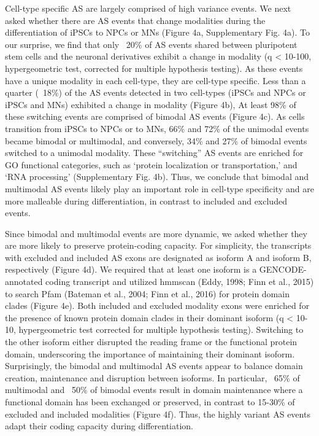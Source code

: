 Cell-type specific AS are largely comprised of high variance events.
We next asked whether there are AS events that change modalities during the differentiation of iPSCs to NPCs or MNs (Figure 4a, Supplementary Fig. 4a). To our surprise, we find that only ~20\% of AS events shared between pluripotent stem cells and the neuronal derivatives exhibit a change in modality (q < 10-100, hypergeometric test, corrected for multiple hypothesis testing). As these events have a unique modality in each cell-type, they are cell-type specific. Less than a quarter (~18\%) of the AS events detected in two cell-types (iPSCs and NPCs or iPSCs and MNs) exhibited a change in modality (Figure 4b), At least 98\% of these switching events are comprised of bimodal AS events (Figure 4c). As cells transition from iPSCs to NPCs or to MNs, 66\% and 72\% of the unimodal events became bimodal or multimodal, and conversely, 34\% and 27\% of bimodal events switched to a unimodal modality. These “switching” AS events are enriched for GO functional categories, such as ‘protein localization or transportation,’ and ‘RNA processing’ (Supplementary Fig. 4b). Thus, we conclude that bimodal and multimodal AS events likely play an important role in cell-type specificity and are more malleable during differentiation, in contrast to included and excluded events.

Since bimodal and multimodal events are more dynamic, we asked whether they are more likely to preserve protein-coding capacity. For simplicity, the transcripts with excluded and included AS exons are designated as isoform A and isoform B, respectively (Figure 4d). We required that at least one isoform is a GENCODE-annotated coding transcript and utilized hmmscan (Eddy, 1998; Finn et al., 2015) to search Pfam (Bateman et al., 2004; Finn et al., 2016) for protein domain clades (Figure 4e). Both included and excluded modality exons were enriched for the presence of known protein domain clades in their dominant isoform (q < 10-10, hypergeometric test corrected for multiple hypothesis testing). Switching to the other isoform either disrupted the reading frame or the functional protein domain, underscoring the importance of maintaining their dominant isoform. Surprisingly, the bimodal and multimodal AS events appear to balance domain creation, maintenance and disruption between isoforms. In particular, ~65\% of multimodal and ~50\% of bimodal events result in domain maintenance where a functional domain has been exchanged or preserved, in contrast to 15-30\% of excluded and included modalities (Figure 4f). Thus, the highly variant AS events adapt their coding capacity during differentiation.


